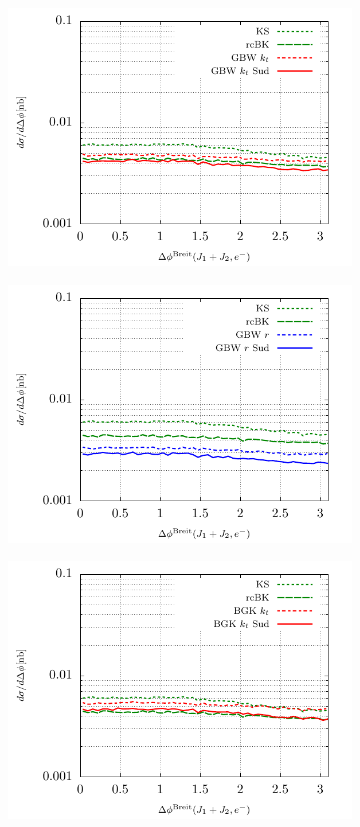 \documentclass[11pt]{article}
\begin{document}
\begin{figure}[p]
\begin{subfigure}{0.5\textwidth}
	\includegraphics[width=\textwidth]{plots/plotGBW2}
	\end{subfigure}
	\begin{subfigure}{0.5\textwidth}
	\includegraphics[width=\textwidth]{plots/plotGBW3}
	\end{subfigure}
	\begin{subfigure}{0.5\textwidth}
	\includegraphics[width=\textwidth]{plots/plotBGK2}

\end{subfigure}
\end{figure}
\end{document}
